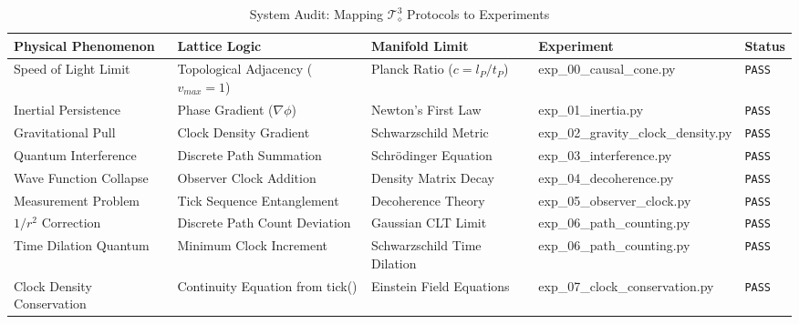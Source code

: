 

\begin{table}[h!]
\centering
\caption{System Audit: Mapping $\mathcal{T}_\diamond^3$ Protocols to Experiments}
\label{tab:audit}
\begin{adjustbox}{max width=\textwidth}
\begin{tabular}{lllll}
\hline
\textbf{Physical Phenomenon} & \textbf{Lattice Logic} & \textbf{Manifold Limit} & \textbf{Experiment} & \textbf{Status} \\
\hline
Speed of Light Limit    & Topological Adjacency ($v_{max}=1$)     & Planck Ratio ($c = l_P/t_P$)   & exp\_00\_causal\_cone.py       & \texttt{PASS} \\
Inertial Persistence    & Phase Gradient ($\nabla\phi$)            & Newton's First Law              & exp\_01\_inertia.py            & \texttt{PASS} \\
Gravitational Pull      & Clock Density Gradient                   & Schwarzschild Metric            & exp\_02\_gravity\_clock\_density.py & \texttt{PASS} \\
Quantum Interference    & Discrete Path Summation                  & Schr\"{o}dinger Equation        & exp\_03\_interference.py       & \texttt{PASS} \\
Wave Function Collapse  & Observer Clock Addition                  & Density Matrix Decay            & exp\_04\_decoherence.py        & \texttt{PASS} \\
Measurement Problem     & Tick Sequence Entanglement               & Decoherence Theory              & exp\_05\_observer\_clock.py    & \texttt{PASS} \\
$1/r^2$ Correction      & Discrete Path Count Deviation            & Gaussian CLT Limit              & exp\_06\_path\_counting.py     & \texttt{PASS} \\
Time Dilation Quantum   & Minimum Clock Increment                  & Schwarzschild Time Dilation     & exp\_06\_path\_counting.py     & \texttt{PASS} \\
Clock Density Conservation & Continuity Equation from tick()       & Einstein Field Equations        & exp\_07\_clock\_conservation.py & \texttt{PASS} \\

\end{tabular}
\end{adjustbox}
\end{table}
